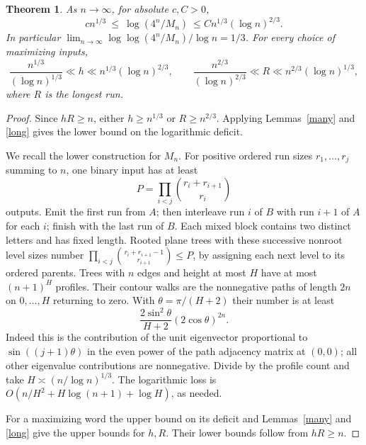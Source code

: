 \documentclass[11pt,letterpaper]{article}
\newtheorem{theorem}{Theorem}
\begin{document}
\begin{theorem}\label{main}
As \(n\to\infty\), for absolute \(c,C>0\),
\[
 c n^{1/3} \ \le\ \log(4^n/M_n)\
       \le C n^{1/3}(\log n)^{2/3}.
\]
In particular \(\lim_{n\to\infty}\log\log(4^n/M_n)/\log n=1/3\). For every choice of maximizing inputs,
\[
 \frac{n^{1/3}}{(\log n)^{1/3}}\ll h\ll n^{1/3}(\log n)^{2/3},\qquad
 \frac{n^{2/3}}{(\log n)^{2/3}}\ll R\ll n^{2/3}(\log n)^{1/3},
\]
where \(R\) is the longest run.
\end{theorem}
\begin{proof}
Since \(hR\ge n\), either \(h\ge n^{1/3}\) or \(R\ge n^{2/3}\). Applying Lemmas~\ref{many} and \ref{long} gives the lower bound on the logarithmic deficit.

We recall the lower construction for \(M_n\). For positive ordered run sizes \(r_1,\ldots,r_j\) summing to \(n\), one binary input has at least
\[
 P=\prod_{i<j}\binom{r_i+r_{i+1}}{r_i}
\]
outputs. Emit the first run from \(A\); then interleave run \(i\) of \(B\) with run \(i+1\) of \(A\) for each \(i\); finish with the last run of \(B\). Each mixed block contains two distinct letters and has fixed length. Rooted plane trees with these successive nonroot level sizes number \(\prod_{i<j}\binom{r_i+r_{i+1}-1}{r_{i+1}}\le P\), by assigning each next level to its ordered parents. Trees with \(n\) edges and height at most \(H\) have at most \((n+1)^H\) profiles. Their contour walks are the nonnegative paths of length \(2n\) on \(0,\ldots,H\) returning to zero. With \(\theta=\pi/(H+2)\) their number is at least
\[
 \frac{2\sin^2\theta}{H+2}(2\cos\theta)^{2n}.
\]
Indeed this is the contribution of the unit eigenvector proportional to \(\sin((j+1)\theta)\) in the even power of the path adjacency matrix at \((0,0)\); all other eigenvalue contributions are nonnegative. Divide by the profile count and take \(H\asymp(n/\log n)^{1/3}\). The logarithmic loss is \(O(n/H^2+H\log(n+1)+\log H)\), as needed.

For a maximizing word the upper bound on its deficit and Lemmas~\ref{many} and \ref{long} give the upper bounds for \(h,R\). Their lower bounds follow from \(hR\ge n\).
\end{proof}
\end{document}
